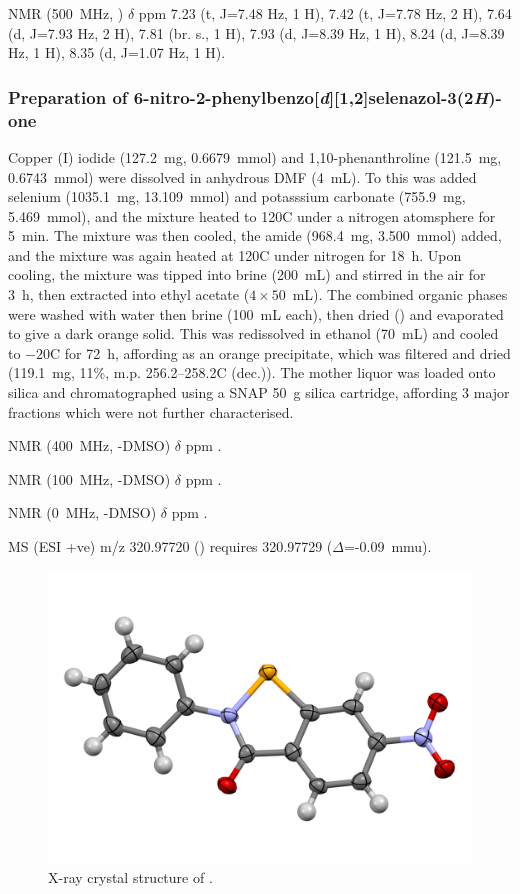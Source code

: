 \begin{refsection}
 NMR (500~MHz, ) $\delta$ ppm
7.23 (t, J=7.48 Hz, 1 H),
7.42 (t, J=7.78 Hz, 2 H),
7.64 (d, J=7.93 Hz, 2 H),
7.81 (br. s., 1 H),
7.93 (d, J=8.39 Hz, 1 H),
8.24 (d, J=8.39 Hz, 1 H),
8.35 (d, J=1.07 Hz, 1 H).

\normalsize

\subsubsection[Preparation of \refcmpd{ebs-3no2}]{Preparation of 6-nitro-2-phenylbenzo[\emph{d}][1,2]selenazol-3(2\emph{H})-one }
Copper (I) iodide (127.2~mg, 0.6679~mmol) and 1,10-phenanthroline (121.5~mg, 0.6743~mmol) were dissolved in anhydrous DMF (4~mL).
To this was added selenium (1035.1~mg, 13.109~mmol) and potasssium carbonate (755.9~mg, 5.469~mmol), and the mixture heated to 120\degree C under a nitrogen atomsphere for 5~min.
The mixture was then cooled, the amide  (968.4~mg, 3.500~mmol) added, and the mixture was again heated at 120\degree C under nitrogen for 18~h.
Upon cooling, the mixture was tipped into brine (200~mL) and stirred in the air for 3~h, then extracted into ethyl acetate ($4\times50$~mL).
The combined organic phases were washed with water then brine (100~mL each), then dried () and evaporated to give a dark orange solid.
This was redissolved in ethanol (70~mL) and cooled to $-20$\degree C for 72~h, affording  as an orange precipitate, which was filtered and dried (119.1~mg, 11\%, m.p. 256.2--258.2\degree C (dec.)).
The mother liquor was loaded onto silica and chromatographed using a SNAP 50~g silica cartridge, affording 3 major fractions which were not further characterised.

{\footnotesize
{} NMR (400~MHz, -DMSO) $\delta$ ppm
.

 NMR (100~MHz, -DMSO) $\delta$ ppm
.

 NMR (0~MHz, -DMSO) $\delta$ ppm
.

MS (ESI +ve) m/z 320.97720 ()  requires 320.97729 ($\Delta$=-0.09~mmu).
}

\begin{figure}[ht]
    \centering
    \includegraphics[width=0.8\linewidth]{Figures/ebs-3no2-xray.pdf}
    \caption{X-ray crystal structure of .}
    \label{fig:ebs-3no2-xray}
\end{figure}


\end{refsection}
